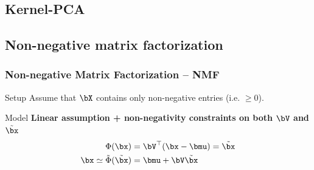 \documentclass{beamer}\usepackage[]{graphicx}\usepackage[]{color}
\begin{document}
\subsection{Kernel-PCA}

\subsection{Non-negative matrix factorization}




\begin{frame}
  \frametitle{Non-negative Matrix Factorization -- NMF}
  
  \begin{block}{Setup}
  Assume that $\bX$ contains only non-negative entries (i.e. $\geq 0$).
  \end{block}
  
  \begin{block}{Model}
   \alert{\bf Linear assumption + non-negativity constraints on both $\bV$ and $\tilde\bx$}
    \begin{align*}
      \Phi(\bx) & = \bV^\top(\bx-\bmu)  = \tilde\bx \\  
      \bx \simeq \tilde{\Phi}(\tilde\bx) & = \bmu + \bV \tilde\bx
    \end{align*}
  \end{block}

\end{frame}
\end{document}
